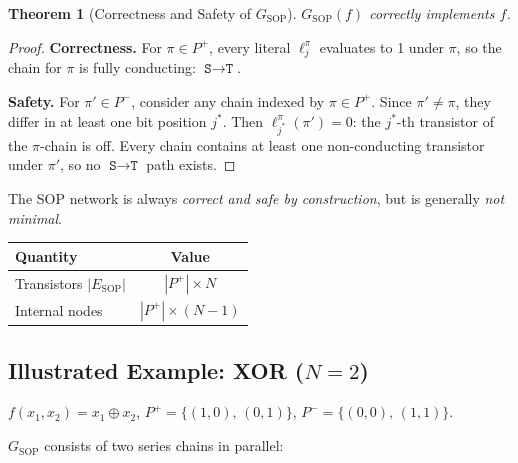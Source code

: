 \documentclass[11pt, a4paper]{article}
\theoremstyle{plain}
\newtheorem{theorem}{Theorem}[section]
\theoremstyle{definition}
\theoremstyle{remark}
\newcommand{\SOURCE}{\texttt{S}}
\newcommand{\SINK}{\texttt{T}}
\newcommand{\Pplus}{P^{+}}
\newcommand{\Pminus}{P^{-}}
\begin{document}
\begin{theorem}[Correctness and Safety of $G_{\mathrm{SOP}}$]
\label{thm:sop}
$G_{\mathrm{SOP}}(f)$ correctly implements $f$.
\end{theorem}

\begin{proof}
\textbf{Correctness.}
For $\pi \in \Pplus$, every literal $\ell_j^\pi$ evaluates to 1
under $\pi$, so the chain for $\pi$ is fully conducting:
$\SOURCE \to \SINK$.

\textbf{Safety.}
For $\pi' \in \Pminus$, consider any chain indexed by $\pi \in \Pplus$.
Since $\pi' \neq \pi$, they differ in at least one bit position $j^*$.
Then $\ell_{j^*}^\pi(\pi') = 0$: the $j^*$-th transistor of the
$\pi$-chain is off.  Every chain contains at least one non-conducting
transistor under $\pi'$, so no $\SOURCE \to \SINK$ path exists.
\end{proof}

The SOP network is always \emph{correct and safe by construction},
but is generally \emph{not minimal}.

\medskip
\begin{center}
\begin{tabular}{lc}
\toprule
\textbf{Quantity} & \textbf{Value} \\
\midrule
Transistors $|E_{\mathrm{SOP}}|$ & $|\Pplus| \times N$ \\
Internal nodes & $|\Pplus| \times (N-1)$ \\
\bottomrule
\end{tabular}
\end{center}

\subsection{Illustrated Example: XOR ($N=2$)}

$f(x_1,x_2) = x_1 \oplus x_2$,\;
$\Pplus = \{(1,0),\,(0,1)\}$,\;
$\Pminus = \{(0,0),\,(1,1)\}$.

$G_{\mathrm{SOP}}$ consists of two series chains in parallel:
\end{document}
